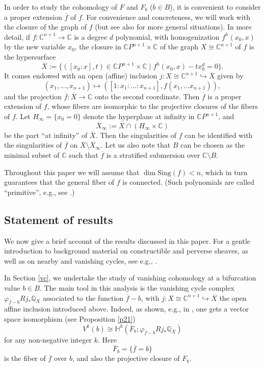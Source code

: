 \documentclass[12pt,leqno,twoside]{amsart}
\theoremstyle{remark}
\theoremstyle{remark}
\theoremstyle{definition}
\theoremstyle{remark}
\theoremstyle{remark}
\theoremstyle{remark}
\numberwithin{equation}{section}  %
\def\be{\begin{equation}}
\def\ee{\end{equation}}
\newcommand{\C}{\mathbb{C}}
\newcommand{\bC}{\mathbb{C}}
\newcommand{\bH}{\mathbb{H}}
\newcommand{\bQ}{\mathbb{Q}}
\newcommand{\of}{\overline{f}}
\newcommand{\oF}{\overline{F}}
\newcommand{\Sing}{\mathrm{Sing}}
\begin{document}
In order to study the cohomology of $F$ and $F_b$ ($b \in B$), it is convenient to consider a proper extension $\overline{f}$ of $f$. For convenience and concreteness, we will work with the closure of the graph of $f$ (but see also \cite{Bre, Di} for more general situations). In more detail, if $f\colon \mathbb{C}^{n+1}\rightarrow \mathbb{C}$ is a degree $d$ polynomial, with homogenization 
$f^h(x_0,x)$ by the new variable $x_0$, the closure in $\bC P^{n+1} \times \bC$ of the graph $X\cong \C^{n+1}$ of $f$ is the hypersurface
\[
\overline{X}:=\{\left([x_0:x],t\right) \in  \bC P^{n+1} \times \bC \mid f^h(x_0,x)-tx_0^d=0  \}.
\]
It comes endowed with an open (affine) inclusion 
$j: X\cong \mathbb{C}^{n+1}\hookrightarrow \overline{X}$ given by 
 \[(x_1,\ldots, x_{n+1})\mapsto ([1: x_1: \ldots : x_{n+1}], f(x_1,\ldots x_{n+1})),\]
and the projection $\overline{f}: \overline{X}\rightarrow \mathbb{C}$ onto the second coordinate. Then $\overline{f}$ is a proper extension of $f$, whose fibers are isomorphic to the projective closures of the fibers of $f$. Let $H_\infty=\{x_0=0\}$ denote the hyperplane at infinity in $\bC P^{n+1}$, and 
\[ \overline{X}_\infty:=\overline{X} \cap (H_\infty \times \bC)\]
be the part ``at infinity'' of $\overline{X}$. Then the singularities of $f$ can be identified with the singularities of $\overline{f}$ on $\overline{X} \setminus \overline{X}_\infty$. Let us also note that $B$ can be chosen as the minimal subset of $\bC$ such that $\overline{f}$ is a stratified submersion over $\bC \setminus B$.

Throughout this paper we will assume that $\dim \Sing(f)<n$, which in turn guarantees that the general fiber of $f$ is connected. (Such polynomials are called ``primitive'', e.g., see \cite[Prop.6.3.5]{Di}.)


\subsection{Statement of results}
We now give a brief account of the results discussed in this paper. For a gentle introduction to background material on constructible and perverse sheaves, as well as on nearby and vanishing cycles, see e.g., \cite{Di, Max, MS}.

\medskip

In Section \ref{vc}, we undertake the study of vanishing cohomology at a bifurcation value $b \in B$. The main tool in this analysis is the vanishing cycle complex $\varphi_{\overline{f}-b}Rj_*\bQ_X$ associated to the function $\of -b$, with  
$j\colon X\cong \mathbb{C}^{n+1}\hookrightarrow \overline{X}$ the open affine inclusion introduced above. Indeed, as shown, e.g., in \cite{Bre}, one gets a vector space isomorphism (see Proposition \ref{p21})
\be\label{eqi1} V^k(b)\cong \bH^k(\overline{F}_b; \varphi_{\overline{f}-b}Rj_*\bQ_X) \ee
for any non-negative integer $k$. Here \[\oF_b=\{\of=b\}\] is the fiber of $\of$ over $b$, and also the projective closure of $F_b$.
\end{document}
